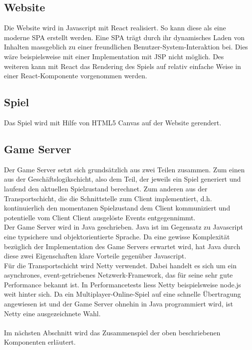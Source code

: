 \documentclass[11pt,ngerman]{article}
\begin{document}
        \subsection{Website}
        Die Website wird in Javascript mit React realisiert. So kann diese als eine moderne \Gls{SPA} erstellt werden. Eine \Gls{SPA} trägt durch ihr dynamisches Laden von Inhalten massgeblich zu einer freundlichen Benutzer-System-Interaktion bei. Dies wäre beispielsweise mit einer Implementation mit \Gls{JSP} nicht möglich. Des weiteren kann mit React das Rendering des Spiels auf relativ einfache Weise in einer React-Komponente vorgenommen werden.
        
        \subsection{Spiel}
        Das Spiel wird mit Hilfe von \Gls{HTML5 Canvas} auf der Website gerendert.

        \subsection{\Gls{Game Server}}
        Der \Gls{Game Server} setzt sich grundsätzlich aus zwei Teilen zusammen. Zum einen aus der Geschäftslogikschicht, also dem Teil, der jeweils ein Spiel generiert und laufend den aktuellen Spielzustand berechnet. Zum anderen aus der Transportschicht, die die Schnittstelle zum Client implementiert, d.h. kontinuierlich den momentanen Spielzustand dem Client kommuniziert und potentielle vom Client Client ausgelöste Events entgegennimmt.\\
        Der \Gls{Game Server} wird in Java geschrieben. Java ist im Gegensatz zu Javascript eine typsichere und objektorientierte Sprache. Da eine gewisse Komplexität bezüglich der Implementation des \Gls{Game Server}s erwartet wird, hat Java durch diese zwei Eigenschaften klare Vorteile gegenüber Javascript.\\
        Für die Transportschicht wird Netty verwendet. Dabei handelt es sich um ein asynchrones, event-getriebenes Netzwerk-Framework, das für seine sehr gute Performance bekannt ist. In Performancetests liess Netty beispielsweise node.js weit hinter sich.\cite{NettyPerformancetests} Da ein Multiplayer-Online-Spiel auf eine schnelle Übertragung angewiesen ist und der \Gls{Game Server} ohnehin in Java programmiert wird, ist Netty eine ausgezeichnete Wahl.\\
        \\
        Im nächsten Abschnitt wird das Zusammenspiel der oben beschriebenen Komponenten erläutert.
\end{document}
